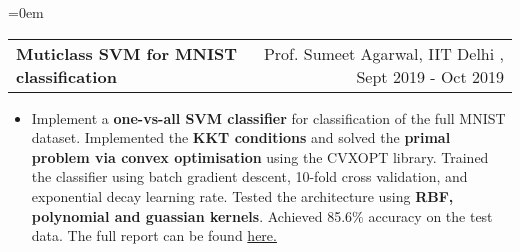 \documentclass{article}
\makeatletter
\newenvironment{longversion}{}{} %
\newcommand{\headerrow}[2]
{\begin{tabular*}{\linewidth}{l@{\extracolsep{\fill}}r}
	#1 &
	#2 \\
\end{tabular*}}
\makeatother
\begin{document}
\begin{longversion}
\begin{list} {}{\leftmargin=0em}
 \item[]
\headerrow { \textbf{Muticlass SVM for MNIST classification}} {Prof. Sumeet Agarwal, IIT Delhi , Sept 2019 - Oct 2019}
 \begin{itemize} \item[]
Implement a \textbf{one-vs-all SVM classifier} for classification of the full MNIST dataset. Implemented the \textbf{KKT conditions} and solved the \textbf{primal problem via convex optimisation} using the CVXOPT library. Trained the classifier using batch gradient descent, 10-fold cross validation, and exponential decay learning rate. Tested the architecture using \textbf{RBF, polynomial and guassian kernels}. Achieved 85.6\% accuracy on the test data. The full report can be found \href{https://csciitd-my.sharepoint.com/:b:/g/personal/ee1170938_iitd_ac_in/EY6gCxDGVMpGpwB8hGwlorYB93PorICEWlWbLB1OlU2WGQ?e=ocqnLY}{here.}
 \end{itemize}

 


\end{list}
\end{longversion}
\end{document}
